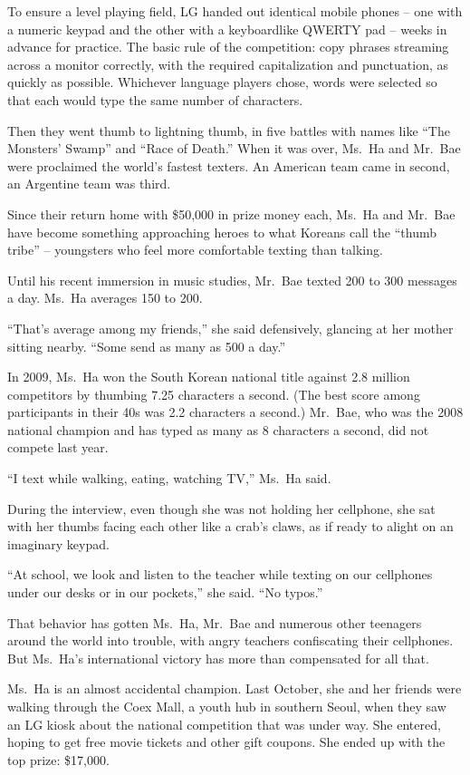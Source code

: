 ﻿\documentclass[12pt]{article}
\begin{document}
To ensure a level playing field, LG handed out identical mobile phones -- one with a numeric keypad
and the other with a keyboardlike QWERTY pad -- weeks in advance for practice. The basic rule of the
competition: copy phrases streaming across a monitor correctly, with the required capitalization and
punctuation, as quickly as possible. Whichever language players chose, words were selected so that
each would type the same number of characters.

Then they went thumb to lightning thumb, in five battles with names like ``The Monsters' Swamp'' and
``Race of Death.'' When it was over, Ms.~Ha and Mr.~Bae were proclaimed the world's fastest texters.
An American team came in second, an Argentine team was third.

Since their return home with \$50,000 in prize money each, Ms.~Ha and Mr.~Bae have become something
approaching heroes to what Koreans call the ``thumb tribe'' -- youngsters who feel more comfortable
texting than talking.

Until his recent immersion in music studies, Mr.~Bae texted 200 to 300 messages a day. Ms.~Ha
averages 150 to 200.

``That's average among my friends,'' she said defensively, glancing at her mother sitting nearby.
``Some send as many as 500 a day.''

In 2009, Ms.~Ha won the South Korean national title against 2.8 million competitors by thumbing 7.25
characters a second. (The best score among participants in their 40s was 2.2 characters a second.)
Mr.~Bae, who was the 2008 national champion and has typed as many as 8 characters a second, did not
compete last year.

``I text while walking, eating, watching TV,'' Ms.~Ha said.

During the interview, even though she was not holding her cellphone, she sat with her thumbs facing
each other like a crab's claws, as if ready to alight on an imaginary keypad.

``At school, we look and listen to the teacher while texting on our cellphones under our desks or in
our pockets,'' she said. ``No typos.''

That behavior has gotten Ms.~Ha, Mr.~Bae and numerous other teenagers around the world into trouble,
with angry teachers confiscating their cellphones. But Ms.~Ha's international victory has more than
compensated for all that.

Ms.~Ha is an almost accidental champion. Last October, she and her friends were walking through the
Coex Mall, a youth hub in southern Seoul, when they saw an LG kiosk about the national competition
that was under way. She entered, hoping to get free movie tickets and other gift coupons. She ended
up with the top prize: \$17,000.
\end{document}
